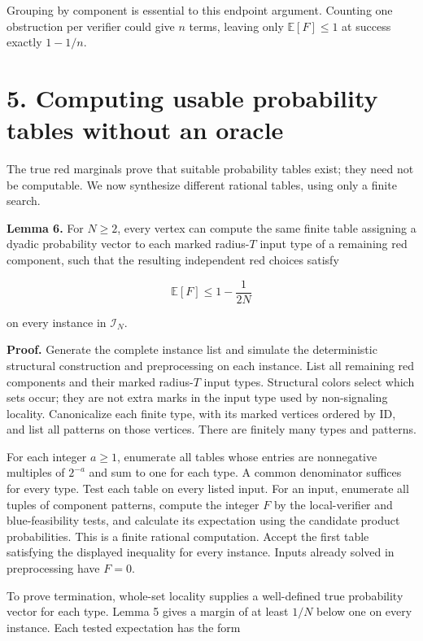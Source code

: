\documentclass[11pt,a4paper]{article}
\begin{document}
Grouping by component is essential to this endpoint argument.
Counting one obstruction per verifier could give \(n\) terms, leaving only \(\mathbb E[F]\le1\) at success exactly \(1-1/n\).

\section{5. Computing usable probability tables without an oracle}\label{computing-usable-probability-tables-without-an-oracle}

The true red marginals prove that suitable probability tables exist; they need not be computable.
We now synthesize different rational tables, using only a finite search.

\textbf{Lemma 6.} For \(N\ge2\), every vertex can compute the same finite table assigning a dyadic probability vector to each marked radius-\(T\) input type of a remaining red component, such that the resulting independent red choices satisfy

\[ \mathbb E[F]\le1-\frac1{2N} \]

on every instance in \(\mathcal I_N\).

\textbf{Proof.} Generate the complete instance list and simulate the deterministic structural construction and preprocessing on each instance.
List all remaining red components and their marked radius-\(T\) input types.
Structural colors select which sets occur; they are not extra marks in the input type used by non-signaling locality.
Canonicalize each finite type, with its marked vertices ordered by ID, and list all patterns on those vertices.
There are finitely many types and patterns.

For each integer \(a\ge1\), enumerate all tables whose entries are nonnegative multiples of \(2^{-a}\) and sum to one for each type.
A common denominator suffices for every type.
Test each table on every listed input.
For an input, enumerate all tuples of component patterns, compute the integer \(F\) by the local-verifier and blue-feasibility tests, and calculate its expectation using the candidate product probabilities.
This is a finite rational computation.
Accept the first table satisfying the displayed inequality for every instance.
Inputs already solved in preprocessing have \(F=0\).

To prove termination, whole-set locality supplies a well-defined true probability vector for each type.
Lemma 5 gives a margin of at least \(1/N\) below one on every instance.
Each tested expectation has the form
\end{document}
